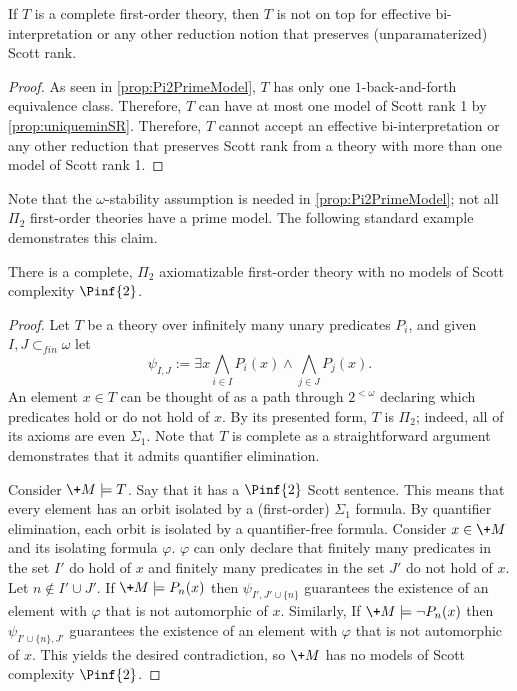 \documentclass[10pt,a4paper]{amsart}
\renewcommand{\-}{\text{-}}
\begin{document}
\begin{corollary}
If $T$ is a complete first-order theory, then $T$ is not on top for effective bi-interpretation or any other reduction notion that preserves (unparamaterized) Scott rank.
\end{corollary}

\begin{proof}
As seen in \cref{prop:Pi2PrimeModel}, $T$ has only one $1$-back-and-forth equivalence class.
Therefore, $T$ can have at most one model of Scott rank 1 by \cref{prop:uniqueminSR}.
Therefore, $T$ cannot accept an effective bi-interpretation or any other reduction that preserves Scott rank from a theory with more than one model of Scott rank 1.
\end{proof}


Note that the $\omega$-stability assumption is needed in \cref{prop:Pi2PrimeModel}; not all $\Pi_2$ first-order theories have a prime model.
The following standard example demonstrates this claim.

\begin{proposition}
There is a complete, $\Pi_2$ axiomatizable first-order theory with no models of Scott complexity $\Pinf{2}$.
\end{proposition}

\begin{proof}
  Let $T$ be a theory over infinitely many unary predicates $P_i$,  and given $I,J\subset_{fin}\omega$ let
\[ \psi_{I,J} := \exists x \bigwedge_{i\in I} P_i(x) \land \bigwedge_{j\in J} P_j(x).\]
An element $x\in T$ can be thought of as a path through $2^{<\omega}$ declaring which predicates hold or do not hold of $x$.
By its presented form, $T$ is $\Pi_2$; indeed, all of its axioms are even $\Sigma_1$.
Note that $T$ is complete as a straightforward argument demonstrates that it admits quantifier elimination.

Consider $\+M\models T$.
Say that it has a $\Pinf{2}$ Scott sentence.
This means that every element has an orbit isolated by a (first-order) $\Sigma_1$ formula.
By quantifier elimination, each orbit is isolated by a quantifier-free formula.
Consider $x\in \+M$ and its isolating formula $\varphi$.
$\varphi$ can only declare that finitely many predicates in the set $I'$ do hold of $x$ and finitely many predicates in the set $J'$ do not hold of $x$.
Let $n\notin I'\cup J'$.
If $\+M\models P_n(x)$ then $\psi_{I',J'\cup\{n\}}$ guarantees the existence of an element with $\varphi$ that is not automorphic of $x$.
Similarly, If $\+M\models \lnot P_n(x)$ then $\psi_{I'\cup\{n\},J'}$ guarantees the existence of an element with $\varphi$ that is not automorphic of $x$.
This yields the desired contradiction, so $\+M$ has no models of Scott complexity $\Pinf{2}$.
\end{proof}
\end{document}
